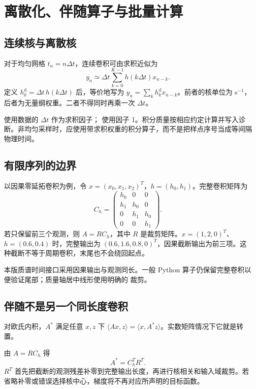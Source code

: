 \chapter{离散化、伴随算子与批量计算}
\section{连续核与离散核}
对于均匀网格 $t_n=n\Delta t$，连续卷积可由求积近似为
\begin{equation}
 y_n\simeq\Delta t\sum_{k=0}^{K-1}h(k\Delta t)x_{n-k}.
\end{equation}
定义 $h_k^{\mathrm d}=\Delta t\,h(k\Delta t)$ 后，等价地写为 $y_n=\sum_k h_k^{\mathrm d}x_{n-k}$。前者的核单位为 s$^{-1}$，后者为无量纲权重。二者不得同时再乘一次 $\Delta t$。

 使用数据的 $\Delta t$ 作为求积因子； 使用因子 1。积分质量按相应约定计算并写入诊断。非均匀采样时，应使用带求积权重的积分算子，而不是把样点序号当成等间隔物理时间。

\section{有限序列的边界}
以因果零延拓卷积为例，令 $x=(x_0,x_1,x_2)^T$，$h=(h_0,h_1)$。完整卷积矩阵为
\begin{equation}
 C_h=\begin{pmatrix}h_0&0&0\\h_1&h_0&0\\0&h_1&h_0\\0&0&h_1\end{pmatrix}.
\end{equation}
若只保留前三个观测，则 $A=RC_h$，其中 $R$ 是裁剪矩阵。$x=(1,2,0)^T$、$h=(0.6,0.4)$ 时，完整输出为 $(0.6,1.6,0.8,0)^T$，因果截断输出为前三项。这种截断不等于周期卷积，末尾也不会绕回起点。

本版质谱时间接口采用因果输出与观测同长。一般 Python 算子仍保留完整卷积以便验证尾部；质量轴居中线形使用明确的  裁剪。

\section{伴随不是另一个同长度卷积}
\begin{definition}[离散伴随]
对欧氏内积，$A^*$ 满足任意 $x,z$ 下 $\langle Ax,z\rangle=\langle x,A^*z\rangle$。实数矩阵情况下它就是转置。
\end{definition}
由 $A=RC_h$ 得
\begin{equation}
 A^*=C_h^TR^T.
\end{equation}
$R^T$ 首先把截断的观测残差补零到完整输出长度，再进行核相关和输入域裁剪。若省略补零或错误选择核中心，梯度将不再对应所声明的目标函数。

